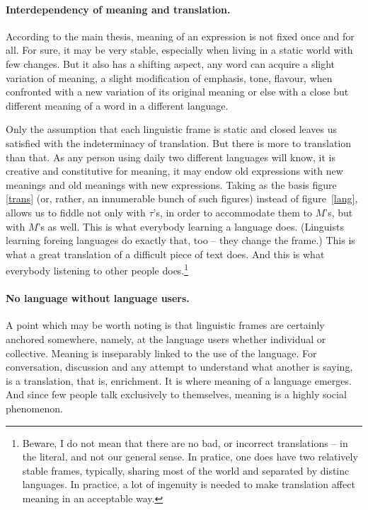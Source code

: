 \documentclass[10pt]{article}
\begin{document}
\paragraph{Interdependency of meaning and translation.}
According to the main thesis, meaning of an expression is not fixed once 
and for all. For sure, it may be very stable, especially when living in a 
static world with few changes. But it also has a shifting aspect, any word 
can acquire a slight variation of meaning, a slight modification of 
emphasis, tone, flavour, when confronted with a new variation of its 
original meaning or else with a close but different meaning of a word in a 
different language. 

Only the assumption that each linguistic frame is static and closed leaves
us satisfied with the 
indeterminacy of translation. But there is more to translation 
than that. As any person using daily two different languages 
will know, it is creative and constitutive for meaning, it may endow old 
expressions with new meanings and old meanings with new expressions.
Taking as the basis figure \ref{trans} (or, rather, an innumerable bunch of such 
figures) instead of figure~\ref{lang}, allows us to fiddle not only with 
$\tau$'s, in order to accommodate them to $M$'s, but with $M$'s as well.
 This is what everybody learning a language does. (Linguists 
learning foreing languages do exactly that, too -- they change the frame.)
This is what a great translation of a difficult piece of text does.
And this is what everybody listening 
to other people does.\footnote{Beware, I do not mean that there are no bad, 
or incorrect translations -- in the literal, and not our general sense. 
In pratice, one does have two relatively stable 
frames, typically, sharing most of the world and separated by distinc 
languages. In practice, a lot of ingenuity is needed to make translation 
affect meaning in an acceptable way.} 

\paragraph{No language without language users.}
A point which may be worth noting is that linguistic frames are certainly 
anchored somewhere, namely, at the language users whether individual or 
collective. Meaning is inseparably linked to the use of the language. 
For conversation, discussion and any attempt to understand what another is 
saying, is a translation, that is, enrichment. It is where meaning of a 
language emerges. And since few people talk exclusively to 
themselves, meaning is a highly social phenomenon. 
\end{document}
